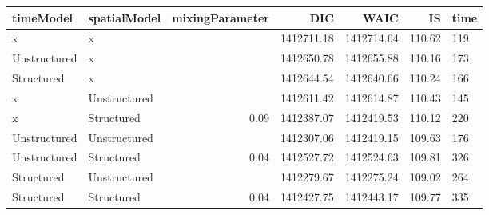 \begin{table}[ht]
\centering
\begin{tabular}{llrrrrl}
  \hline
timeModel & spatialModel & mixingParameter & DIC & WAIC & IS & time \\ 
  \hline
x & x &  & 1412711.18 & 1412714.64 & 110.62 & 119 \\ 
  Unstructured & x &  & 1412650.78 & 1412655.88 & 110.16 & 173 \\ 
  Structured & x &  & 1412644.54 & 1412640.66 & 110.24 & 166 \\ 
  x & Unstructured &  & 1412611.42 & 1412614.87 & 110.43 & 145 \\ 
  x & Structured & 0.09 & 1412387.07 & 1412419.53 & 110.12 & 220 \\ 
  Unstructured & Unstructured &  & 1412307.06 & 1412419.15 & 109.63 & 176 \\ 
  Unstructured & Structured & 0.04 & 1412527.72 & 1412524.63 & 109.81 & 326 \\ 
  Structured & Unstructured &  & 1412279.67 & 1412275.24 & 109.02 & 264 \\ 
  Structured & Structured & 0.04 & 1412427.75 & 1412443.17 & 109.77 & 335 \\ 
   \hline
\end{tabular}
\end{table}
